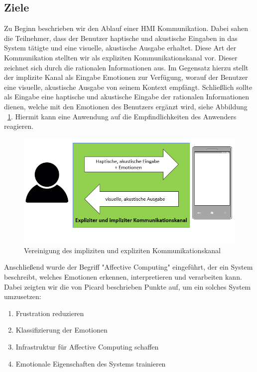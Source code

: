 \subsection{Ziele}

Zu Beginn beschrieben wir den Ablauf einer \ac{HMI} Kommunikation. Dabei sahen die Teilnehmer, dass der Benutzer haptische und akustische Eingaben in das System tätigte und eine visuelle, akustische Ausgabe erhaltet. Diese Art der Kommunikation stellten wir als expliziten Kommunikationskanal vor. Dieser zeichnet sich durch die rationalen Informationen aus. Im Gegensatz hierzu stellt der implizite Kanal als Eingabe Emotionen zur Verfügung, worauf der Benutzer eine visuelle, akustische Ausgabe von seinem Kontext empfängt. Schließlich sollte als Eingabe eine haptische und akustische Eingabe der rationalen Informationen dienen, welche mit den Emotionen des Benutzers ergänzt wird, siehe Abbildung ~\ref{fig:communiationskanal}. Hiermit kann eine Anwendung auf die Empfindlichkeiten des Anwenders reagieren. 

\begin{figure}[!h]
	\centering
	\includegraphics[width=0.9\linewidth]{Pictures/impliziter_expliziter_Kanal}
	\caption[Vereinigung des impliziten und expliziten Kommunikationskanal]{Vereinigung des impliziten und expliziten Kommunikationskanal}
	\label{fig:communiationskanal}
\end{figure}  

Anschließend wurde der Begriff "Affective Computing" eingeführt, der ein System beschreibt, welches Emotionen erkennen, interpretieren und verarbeiten kann. Dabei zeigten wir die von Picard beschrieben Punkte auf, um ein solches System umzusetzen:

\vspace{2mm}
\begin{enumerate}
	\item Frustration reduzieren
	\item Klassifizierung der Emotionen
	\item Infrastruktur für Affective Computing schaffen
	\item Emotionale Eigenschaften des Systems trainieren
\end{enumerate}
\vspace{2mm}

